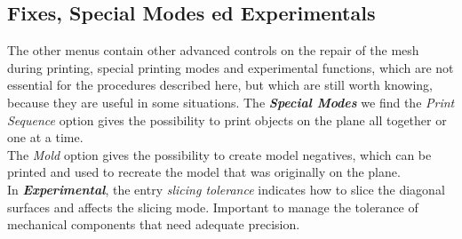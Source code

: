 \subsection{Fixes, Special Modes ed Experimentals}
The other menus contain other advanced controls on the repair of the mesh during printing, special printing modes and experimental functions, which are not essential for the procedures described here, but which are still worth knowing, because they are useful in some situations.
The \emph{\textbf{Special Modes}} we find the \emph{Print Sequence} option gives the possibility to print objects on the plane all together or one at a time. \\
The \emph{Mold} option gives the possibility to create model negatives, which can be printed and used to recreate the model that was originally on the plane. \\
In \emph{\textbf{Experimental}}, the entry \emph{slicing tolerance} indicates how to slice the diagonal surfaces and affects the slicing \parencite{Reference56} mode. Important to manage the tolerance of mechanical components that need adequate precision.
